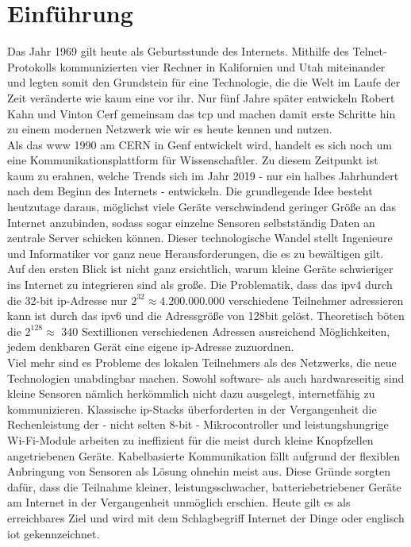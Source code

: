 \section{Einführung}

	Das Jahr 1969 gilt heute als Geburtsstunde des Internets. Mithilfe des Telnet-Protokolls kommunizierten vier Rechner in Kalifornien und Utah miteinander und legten somit den Grundstein für eine Technologie, die die Welt im Laufe der Zeit veränderte wie kaum eine vor ihr. \cite{lmzgeschichte} Nur fünf Jahre später entwickeln Robert Kahn und Vinton Cerf gemeinsam das \ac{tcp} und machen damit erste Schritte hin zu einem modernen Netzwerk wie wir es heute kennen und nutzen.\\
	Als das \ac{www} 1990 am CERN in Genf entwickelt wird, handelt es sich noch um eine Kommunikationsplattform für Wissenschaftler. Zu diesem Zeitpunkt ist kaum zu erahnen, welche Trends sich im Jahr 2019 - nur ein halbes Jahrhundert nach dem Beginn des Internets - entwickeln. Die grundlegende Idee besteht heutzutage daraus, möglichst viele Geräte verschwindend geringer Größe an das Internet anzubinden, sodass sogar einzelne Sensoren selbstständig Daten an zentrale Server schicken können. Dieser technologische Wandel stellt Ingenieure und Informatiker vor ganz neue Herausforderungen, die es zu bewältigen gilt. \\
	Auf den ersten Blick ist nicht ganz ersichtlich, warum kleine Geräte schwieriger ins Internet zu integrieren sind als große. Die Problematik, dass das \ac{ipv4} durch die 32-bit \ac{ip}-Adresse nur $2^{32}\approx4.200.000.000$ verschiedene Teilnehmer adressieren kann ist durch das \ac{ipv6} und die Adressgröße von 128bit gelöst. Theoretisch böten die $2^{128}\approx$ 340 Sextillionen verschiedenen Adressen ausreichend Möglichkeiten, jedem denkbaren Gerät eine eigene \ac{ip}-Adresse zuzuordnen.\\
	Viel mehr sind es Probleme des lokalen Teilnehmers als des Netzwerks, die neue Technologien unabdingbar machen. Sowohl software- als auch hardwareseitig sind kleine Sensoren nämlich herkömmlich nicht dazu ausgelegt, internetfähig zu kommunizieren. Klassische \ac{ip}-Stacks überforderten in der Vergangenheit die Rechenleistung der - nicht selten 8-bit - Mikrocontroller und leistungshungrige Wi-Fi-Module arbeiten zu ineffizient für die meist durch kleine Knopfzellen angetriebenen Geräte. Kabelbasierte Kommunikation fällt aufgrund der flexiblen Anbringung von Sensoren als Lösung ohnehin meist aus. Diese Gründe sorgten dafür, dass die Teilnahme kleiner, leistungsschwacher, batteriebetriebener Geräte am Internet in der Vergangenheit unmöglich erschien. Heute gilt es als erreichbares Ziel und wird mit dem Schlagbegriff Internet der Dinge oder englisch \ac{iot} gekennzeichnet.\\
